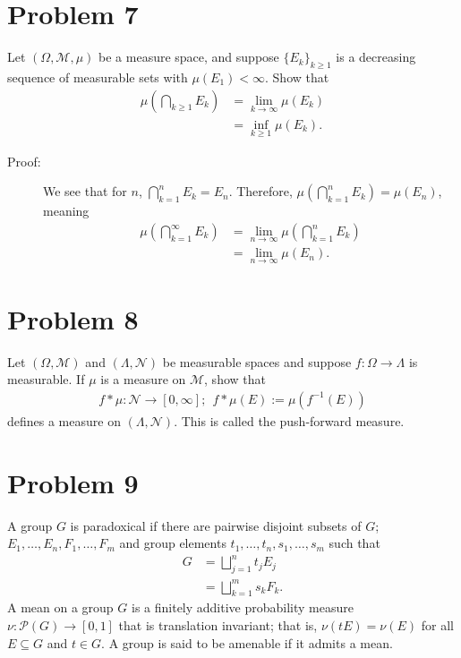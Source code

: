 \documentclass[10pt]{extarticle}
\begin{document}
  \section{Problem 7}%
  Let $(\Omega,\mathcal{M},\mu)$ be a measure space, and suppose $\{E_k\}_{k\geq 1}$ is a decreasing sequence of measurable sets with $\mu(E_1) < \infty$. Show that
  \begin{align*}
    \mu\left(\bigcap_{k\geq 1}E_k\right) &= \lim_{k\rightarrow\infty}\mu(E_k)\\
                                         &= \inf_{k\geq 1}\mu(E_k).
  \end{align*}
  \begin{description}
    \item[Proof:] We see that for $n$, $\bigcap_{k=1}^{n}E_k = E_n$. Therefore, $\mu\left(\bigcap_{k=1}^{n}E_k\right) = \mu(E_n)$, meaning
      \begin{align*}
        \mu\left(\bigcap_{k=1}^{\infty}E_k\right) &= \lim_{n\rightarrow\infty}\mu\left(\bigcap_{k=1}^{n}E_k\right)\\
                                                  &= \lim_{n\rightarrow\infty}\mu(E_n).
      \end{align*}
  \end{description}
  \section{Problem 8}%
  Let $(\Omega,\mathcal{M})$ and $(\Lambda,\mathcal{N})$ be measurable spaces and suppose $f: \Omega \rightarrow \Lambda$ is measurable. If $\mu$ is a measure on $\mathcal{M}$, show that
  \begin{align*}
    f\ast \mu: \mathcal{N}\rightarrow [0,\infty];~~f\ast \mu(E) := \mu(f^{-1}(E))
  \end{align*}
  defines a measure on $(\Lambda,\mathcal{N})$. This is called the push-forward measure.
  \section{Problem 9}%
  A group $G$ is paradoxical if there are pairwise disjoint subsets of $G$; $E_1,\dots,E_n,F_1,\dots,F_m$ and group elements $t_1,\dots,t_n,s_1,\dots,s_m$ such that
  \begin{align*}
    G &= \bigsqcup_{j=1}^{n}t_jE_j\\
      &= \bigsqcup_{k=1}^{m}s_kF_k.
  \end{align*}
  A mean on a group $G$ is a finitely additive probability measure $\nu: \mathcal{P}(G)\rightarrow [0,1]$ that is translation invariant; that is, $\nu(tE) = \nu(E)$ for all $E\subseteq G$ and $t\in G$. A group is said to be amenable if it admits a mean.\\
\end{document}
